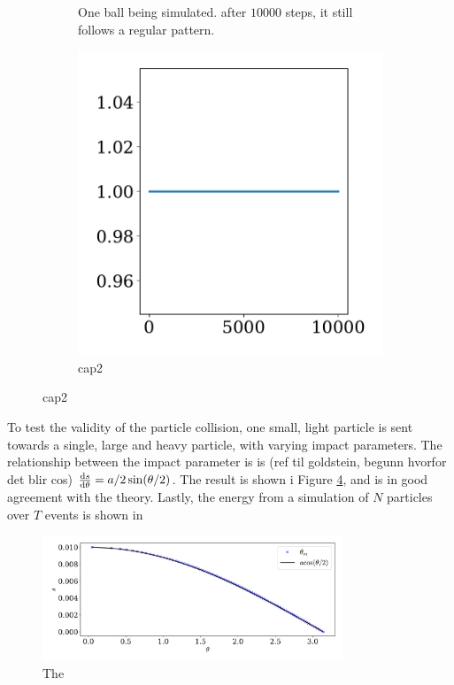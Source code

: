 \documentclass{article}
\begin{document}
\begin{figure}
\begin{subfigure}{.35\textwidth}
                \caption{One ball being simulated. after $10 000$ steps, it still follows a regular pattern.}
                \label{single particle}
            \end{subfigure}
            \begin{subfigure}{.65\textwidth}
                \includegraphics[width=.8\textwidth]{../plots/test_case_one_particle/energy.pdf}
                \caption{cap2}
                \label{lab2}
            \end{subfigure}
        \end{figure}
        
        To test the validity of the particle collision, one small, light particle is sent towards a single, large and heavy particle, with varying impact parameters. The relationship between the impact parameter is is (ref til goldstein, begunn hvorfor det blir cos) $\dv{s}{\theta} = a / 2 \sin(\theta / 2)$. The result is shown i Figure \ref{scattering}, and is in good agreement with the theory. Lastly, the energy from a simulation of $N$ particles over $T$ events is shown in


        \begin{figure}
            \centering
            \includegraphics[width=0.8\textwidth]{../plots/test_case_collision_angle/collision_angle.pdf}
            \caption{The }
            \label{scattering}
        \end{figure}
\end{document}
